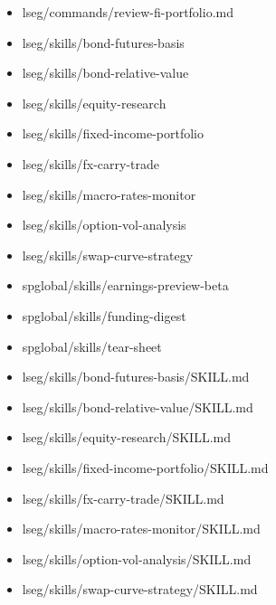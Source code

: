 \documentclass[11pt]{article}
\begin{document}
\begin{itemize}[leftmargin=*,itemsep=1pt,topsep=2pt]
\item \hspace*{1.8em}lseg/commands/review-fi-portfolio.md
\item \hspace*{1.8em}lseg/skills/bond-futures-basis
\item \hspace*{1.8em}lseg/skills/bond-relative-value
\item \hspace*{1.8em}lseg/skills/equity-research
\item \hspace*{1.8em}lseg/skills/fixed-income-portfolio
\item \hspace*{1.8em}lseg/skills/fx-carry-trade
\item \hspace*{1.8em}lseg/skills/macro-rates-monitor
\item \hspace*{1.8em}lseg/skills/option-vol-analysis
\item \hspace*{1.8em}lseg/skills/swap-curve-strategy
\item \hspace*{1.8em}spglobal/skills/earnings-preview-beta
\item \hspace*{1.8em}spglobal/skills/funding-digest
\item \hspace*{1.8em}spglobal/skills/tear-sheet
\item \hspace*{2.7em}lseg/skills/bond-futures-basis/SKILL.md
\item \hspace*{2.7em}lseg/skills/bond-relative-value/SKILL.md
\item \hspace*{2.7em}lseg/skills/equity-research/SKILL.md
\item \hspace*{2.7em}lseg/skills/fixed-income-portfolio/SKILL.md
\item \hspace*{2.7em}lseg/skills/fx-carry-trade/SKILL.md
\item \hspace*{2.7em}lseg/skills/macro-rates-monitor/SKILL.md
\item \hspace*{2.7em}lseg/skills/option-vol-analysis/SKILL.md
\item \hspace*{2.7em}lseg/skills/swap-curve-strategy/SKILL.md

\end{itemize}
\end{document}
